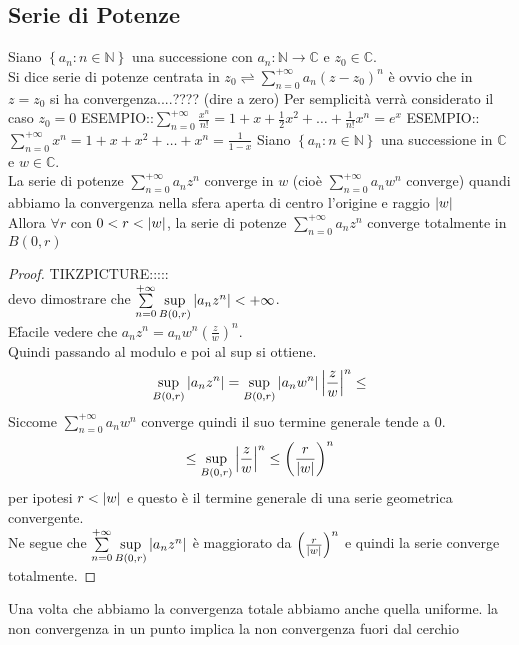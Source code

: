 \subsection{Serie di Potenze}
Siano $\left\{a_n:n\in\mathbb{N}\right\}$ una successione con $a_n:\mathbb{N}\to\mathbb{C}$ e $z_0\in\mathbb{C}$.\\
Si dice serie di potenze centrata in $z_0 \rightleftharpoons \sum\limits_{n=0}^{+\infty}a_n\left(z-z_0\right)^n$ 
\observation
è ovvio che in $z=z_0$ si ha convergenza....???? (dire a zero)
\observation
Per semplicità verrà considerato il caso $z_0=0$
ESEMPIO::$\sum\limits_{n=0}^{+\infty}\frac{x^n}{n!}=1+x+\frac{1}{2} x^2+\ldots+\frac{1}{n!}x^n=e^x$ 
ESEMPIO::$\sum\limits_{n=0}^{+\infty}x^n=1+x+x^2+\ldots+x^n=\frac{1}{1-x}$
\proposition
Siano $\left\{a_n:n\in\mathbb{N}\right\}$ una successione in $\mathbb{C}$ e $w\in\mathbb{C}$.\\
La serie di potenze $\sum\limits_{n=0}^{+\infty}a_nz^n$ converge in $w$ (cioè $\sum\limits_{n=0}^{+\infty}a_nw^n$ converge) quandi abbiamo la convergenza nella sfera aperta di centro l'origine e raggio $\left|w\right|$\\
Allora $\forall r$ con $0<r<\left|w\right|$, la serie di potenze $\sum\limits_{n=0}^{+\infty}a_nz^n$ converge totalmente in $B(0,r)$\\
\begin{proof}
	TIKZPICTURE:::::\\
	devo dimostrare che $\sum\limits_{n=0}^{+\infty}\sup\limits_{B(0,r)}\left|a_nz^n\right|<+\infty$.\\
	E\' facile vedere che $a_nz^n=a_nw^n\left(\frac{z}{w}\right)^n$.\\
	Quindi passando al modulo e poi al sup si ottiene.\\
	$$\sup\limits_{B(0,r)}\left|a_nz^n\right|=\sup\limits_{B(0,r)}\left|a_nw^n\right|\left|\frac{z}{w}\right|^n\le$$
	Siccome $\sum\limits_{n=0}^{+\infty}a_nw^n$ converge  quindi il suo termine generale tende a $0$.\\
	$$\le\sup\limits_{B(0,r)}\left|\frac{z}{w}\right|^n\le\left(\frac{r}{\left|w\right|}\right)^n $$
	per ipotesi $r<\left|w\right|$ e questo è il termine generale di una serie geometrica convergente.\\
	Ne segue che $\sum\limits_{n=0}^{+\infty}\sup\limits_{B(0,r)}\left|a_nz^n\right|$ è maggiorato da $\left( \frac{r}{\left|w\right|}\right)^n$ e quindi la serie converge totalmente.
\end{proof}
\observation
Una volta che abbiamo la convergenza totale abbiamo anche quella uniforme.
\proposition la non convergenza in un punto implica la non convergenza fuori dal cerchio\\
